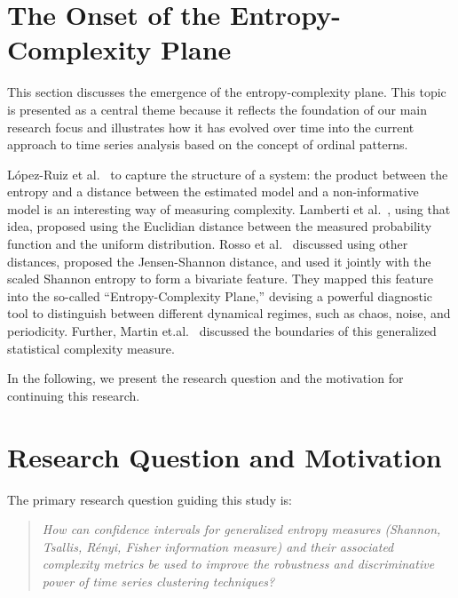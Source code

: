 

\section{The Onset of the Entropy-Complexity Plane}\label{Sec:Onset}

This section discusses the emergence of the entropy-complexity plane. This topic is presented as a central theme because it reflects the foundation of our main research focus and illustrates how it has evolved over time into the current approach to time series analysis based on the concept of ordinal patterns. 

López-Ruiz et al.~\cite{lopez1995statistical} to capture the structure of a system:
the product between the entropy and a distance between the estimated model and a non-informative model is an interesting way of measuring complexity.
Lamberti et al.~\cite{lamberti2004intensive}, using that idea, proposed using the Euclidian distance between the measured probability function and the uniform distribution.
Rosso et al.~\cite{EEGAnalysisUsingWaveletBasedInformationTools} discussed using other distances, proposed the Jensen-Shannon distance, and used it jointly with the scaled Shannon entropy to form a bivariate feature.
They mapped this feature into the so-called ``Entropy-Complexity Plane,'' devising  a powerful diagnostic tool to distinguish between different dynamical regimes, such as chaos, noise, and periodicity.
Further, Martin et.al.~\cite{Martin2006} discussed the boundaries of this generalized statistical complexity measure. 

In the following, we present the research question and the motivation for continuing this research. 

\section{Research Question and Motivation}\label{Sec:ResearchQuestion}

The primary research question guiding this study is:
\begin{quote}
	\textit{How can confidence intervals for generalized entropy measures (Shannon, Tsallis, Rényi, Fisher information measure) and their associated complexity metrics be used to improve the robustness and discriminative power of time series clustering techniques?}
\end{quote}

